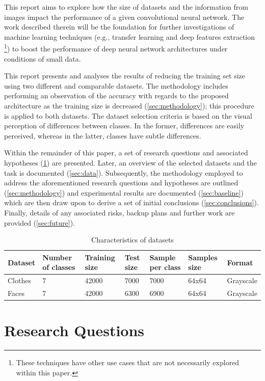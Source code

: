 \documentclass{article}
\begin{document}
This report aims to explore how the size of datasets and the information from images impact the performance of a given convolutional neural network. The work described therein will be the foundation for further investigations of machine learning techniques (e.g., transfer learning and deep features extraction \footnote{These techniques have other use cases that are not necessarily explored within this paper.}) to boost the performance of deep neural network architectures under conditions of small data.

This report presents and analyses the results of reducing the training set size using two different and comparable datasets. The methodology includes performing an observation of the accuracy with regards to the proposed architecture as the training size is decreased (\ref{sec:methodology}); this procedure is applied to both datasets. The dataset selection criteria is based on the visual perception of differences between classes. In the former, differences are easily perceived, whereas in the latter, classes have subtle differences.

Within the remainder of this paper, a set of research questions and associated hypotheses (\ref{sec:questions}) are presented. Later, an overview of the selected datasets and the task is documented (\ref{sec:data}). Subsequently, the methodology employed to address the aforementioned research questions and hypotheses are outlined (\ref{sec:methodology}) and experimental results are documented (\ref{sec:baseline}) which are then draw upon to derive a set of initial conclusions (\ref{sec:conclusions}). Finally, details of any associated risks, backup plans and further work are provided (\ref{sec:future}).

 
\begin{table}[!htb]
  \centering
  \begin{tabular}{| l | l | l | l | l | l | l |}
    \hline
    \textbf{Dataset} & \textbf{Number of classes} & \textbf{Training size} & \textbf{Test size}  &  \textbf{Sample per class} & \textbf{Samples size} & \textbf{Format} \\ \hline
    Clothes & 7 & 42000 & 7000 & 7000 & 64x64 & Grayscale\\ \hline
    Faces & 7 & 42000 & 6300 & 6900 & 64x64 & Grayscale\\ \hline
  \end{tabular}
  \caption{Characteristics of datasets}
  \label{tab:1}
\end{table}

\section{Research Questions}
\label{sec:questions}
\end{document}
